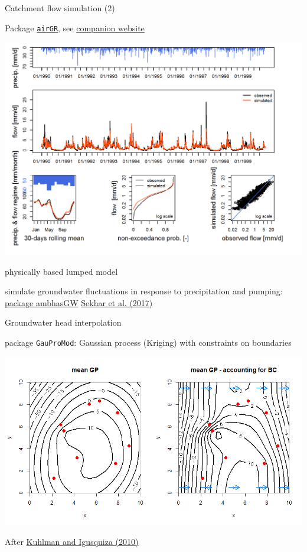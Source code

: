 \documentclass[8pt,ignorenonframetext,]{beamer}
\begin{document}
\begin{frame}[fragile]{Catchment flow simulation (2)}

Package
\href{https://cran.r-project.org/web/packages/airGR/index.html}{\texttt{airGR}},
see \href{https://odelaigue.github.io/airGR/index.html}{companion
website}

\includegraphics{imgPres/airGR.png}

\end{frame}

\begin{frame}{physically based lumped model}

simulate groundwater fluctuations in response to precipitation and
pumping: \href{https://cran.r-project.org/package=ambhasGW}{package
ambhasGW} \href{www.mdpi.com/2071-1050/10/1/26/pdf}{Sekhar et al.
(2017)}

\end{frame}

\begin{frame}[fragile]{Groundwater head interpolation}

package \texttt{GauProMod}: Gaussian process (Kriging) with constraints
on boundaries

\includegraphics{imgPres/GP_head_interpolation.png}

After \href{https://doi.org/10.1016/j.jhydrol.2010.01.002}{Kuhlman and
Igusquiza (2010)}

\end{frame}
\end{document}
